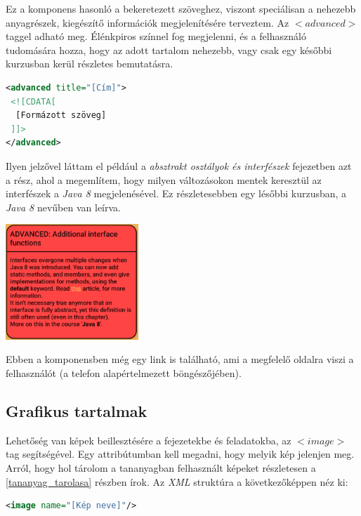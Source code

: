 \documentclass[12pt,a4paper]{article}
\newcommand{\xml}{\textit{XML}\xspace}
\begin{document}
	Ez a komponens hasonló a bekeretezett szöveghez, viszont speciálisan a nehezebb anyagrészek, kiegészítő információk megjelenítésére terveztem. Az $<advanced>$ taggel adható meg. Élénkpiros színnel fog megjelenni, és a felhasználó tudomására hozza, hogy az adott tartalom nehezebb, vagy csak egy későbbi kurzusban kerül részletes bemutatásra.
	
	\bigskip
	\begin{lstlisting}[language=XML]
<advanced title="[Cím]">
 <![CDATA[
  [Formázott szöveg]
 ]]>
</advanced>	
	\end{lstlisting}
	\bigskip
	
	Ilyen jelzővel láttam el például a \textit{absztrakt osztályok és interfészek} fejezetben azt a rész, ahol a megemlítem, hogy milyen változásokon mentek keresztül az interfészek a \textit{Java 8} megjelenésével.  Ez részletesebben egy lésőbbi kurzusban, a \textit{Java 8} nevűben van leírva.
	
	\begin{center}
		\includegraphics[width=5cm]{advanced_component}
	\end{center}
	
	Ebben a komponensben még egy link is található, ami a megfelelő oldalra viszi a felhasználót (a telefon alapértelmezett böngészőjében).
	
	\subsection{Grafikus tartalmak}
	
	Lehetőség van képek beillesztésére a fejezetekbe és feladatokba, az $<image>$ tag segítségével. Egy attribútumban kell megadni, hogy melyik kép jelenjen meg. Arról, hogy hol tárolom a tananyagban felhasznált képeket részletesen a \ref{tananyag_tarolasa} részben írok. Az \xml struktúra a következőképpen néz ki:
	
	\bigskip
	\begin{lstlisting}[language=XML]
	<image name="[Kép neve]"/>
	\end{lstlisting}
	
\end{document}
